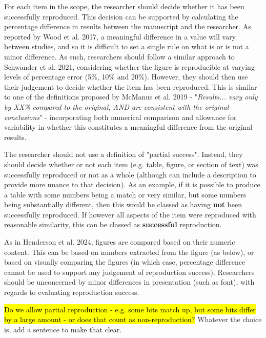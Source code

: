 For each item in the scope, the researcher should decide whether it has been successfully reproduced. This decision can be supported by calculating the percentage difference in results between the manuscript and the researcher. As reported by Wood et al. 2017,\autocite{wood_push_2018, wood_replication_2018} a meaningful difference in a value will vary between studies, and so it is difficult to set a single rule on what is or is not a minor difference. As such, researchers should follow a similar approach to Schwander et al. 2021,\autocite{schwander_replication_2021} considering whether the figure is reproducible at varying levels of percentage error (5\%, 10\% and 20\%). However, they should then use their judgement to decide whether the item has been reproduced. This is similar to one of the definitions proposed by McManus et al. 2019\autocite{mcmanus_can_2019} - "\textit{Results... vary only by XX\% compared to the original, AND are consistent with the original conclusions}" - incorporating both numerical comparison and allowance for variability in whether this constitutes a meaningful difference from the original results.

The researcher should not use a definition of "partial success". Instead, they should decide whether or not each item (e.g. table, figure, or section of text) was successfully reproduced or not as a whole (although can include a description to provide more nuance to that decision). As an example, if it is possible to produce a table with some numbers being a match or very similar, but some numbers being substantially different, then this would be classed as having \textbf{not} been successfully reproduced. If however all aspects of the item were reproduced with reasonable similarity, this can be classed as \textbf{successful} reproduction.

As in Henderson et al. 2024,\autocite{henderson_reproducibility_2024} figures are compared based on their numeric content. This can be based on numbers extracted from the figure (as below), or based on visually comparing the figures (in which case, percentage difference cannot be used to support any judgement of reproduction success). Researchers should be unconcerned by minor differences in presentation (such as font), with regards to evaluating reproduction success.

\hl{Do we allow partial reproduction - e.g. some bits match up, but some bits differ by a large amount - or does that count as non-reproduction?} Whatever the choice is, add a sentence to make that clear.


